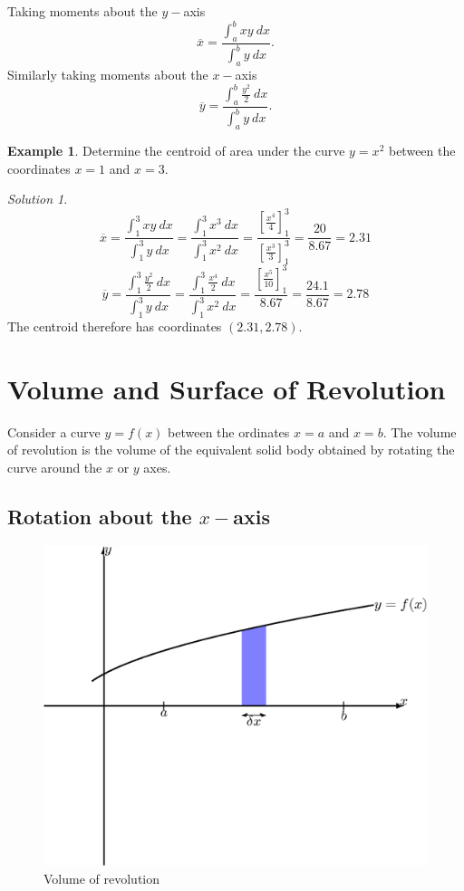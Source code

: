 \documentclass[
  11pt,
  oneside]{book}
\newcommand{\slide}{}
\theoremstyle{definition}
\theoremstyle{definition}
\newtheorem{example}{Example}[chapter]
\theoremstyle{definition}
\theoremstyle{definition}
\theoremstyle{remark}
\newtheorem*{solution}{Solution}
\begin{document}
\slide

Taking moments about the \(y-\)axis
\[
\overline x = \frac{\displaystyle\int_a^bxy\ dx}{\displaystyle\int_a^b y\ dx}.
\]
Similarly taking moments about the \(x-\)axis
\[
\overline y = \frac{\displaystyle\int_a^b \frac{y^2}2\ dx}{\displaystyle\int_a^b y\ dx}.
\]
\slide

\begin{example}
Determine the centroid of area under the curve \(y=x^2\) between the coordinates \(x=1\) and \(x=3\).
\end{example}

\begin{solution}
\[
\overline x = \frac{\displaystyle\int_1^3xy\ dx}{\displaystyle\int_1^3 y\ dx} = \frac{\displaystyle\int_1^3x^3\ dx}{\displaystyle\int_1^3x^2\ dx} = \frac{\left[\frac{x^4}{4}\right]_1^3}{\left[\frac{x^3}{3}\right]_1^3} = \frac{20}{8.67} = 2.31
\]
\[
\overline y = \frac{\displaystyle\int_1^3\frac{y^2}2\ dx}{\displaystyle\int_1^3 y\ dx} = \frac{\displaystyle\int_1^3\frac{x^4}2\ dx}{\displaystyle\int_1^3x^2\ dx} = \frac{\left[\frac{x^5}{10}\right]_1^3}{8.67} = \frac{24.1}{8.67} = 2.78
\]
The centroid therefore has coordinates \((2.31,2.78)\).
\end{solution}

\slide

\section{Volume and Surface of Revolution}\label{volume-and-surface-of-revolution}

Consider a curve \(y = f(x)\) between the ordinates \(x = a\) and \(x = b\). The volume of revolution is the volume of the equivalent solid body obtained by rotating the curve around the \(x\) or \(y\) axes.

\slide

\subsection{\texorpdfstring{Rotation about the \(x-\)axis}{Rotation about the x-axis}}\label{rotation-about-the-x-axis}

\begin{figure}

{\centering \includegraphics[width=0.4\linewidth]{tikztopng-figure40} 

}

\caption{Volume of revolution}\label{fig:unnamed-chunk-70}
\end{figure}
\end{document}
